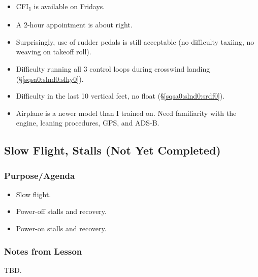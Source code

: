 \documentclass[letterpaper,10pt,titlepage]{article}
\begin{document}
\begin{itemize}
\item CFI\textsubscript{1} is available on Fridays.
\item A 2-hour appointment is about right.
\item Surprisingly, use of rudder pedals is still acceptable (no difficulty taxiing,
      no weaving on takeoff roll).
\item Difficulty running all 3 control loops during crosswind landing
      (\S{}\ref{sqsa0:slnd0:slhy0}).
\item Difficulty in the last 10 vertical feet, no float 
      (\S{}\ref{sqsa0:slnd0:srdf0}).
\item Airplane is a newer model than I trained on.  Need familiarity with the engine,
      leaning procedures, GPS, and ADS-B.	  
\end{itemize}



\subsection{Slow Flight, Stalls (Not Yet Completed)}
\label{sfle0:ssfs0}



\subsubsection{Purpose/Agenda}
\label{sfle0:ssfs0:spov0}

\begin{itemize}
\item Slow flight.
\item Power-off stalls and recovery.
\item Power-on stalls and recovery.
\end{itemize}


\subsubsection{Notes from Lesson}
\label{sfle0:ssfs0:snff0}

TBD.


\end{document}
